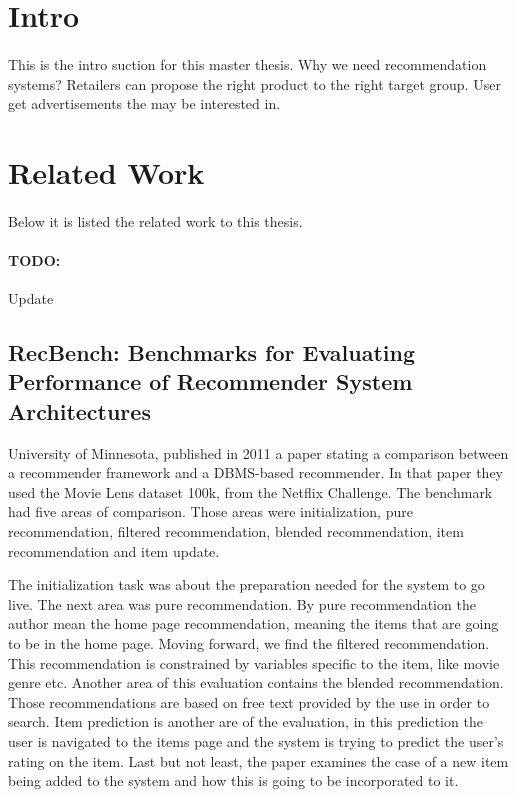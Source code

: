 \section{Intro}
\paragraph{} This is the intro suction for this master thesis.
Why we need recommendation systems? Retailers can propose the right product to the right target group.
User get advertisements the may be interested in.\cite{RecommenderSystems:2}


\section{Related Work}
\paragraph{} Below it is listed the related work to this thesis.
\paragraph{TODO:} Update
\subsection{RecBench: Benchmarks for Evaluating Performance of Recommender System Architectures \cite{levandoski2011recbench}}
University of Minnesota, published in 2011 a paper stating a comparison between a recommender framework and a DBMS-based recommender. In that paper they used the Movie Lens dataset 100k, from the Netflix Challenge. The benchmark had five areas of comparison. Those areas were initialization, pure recommendation, filtered recommendation, blended recommendation, item recommendation and item update.

The initialization task was about the preparation needed for the system to go live. The next area was pure recommendation. By pure recommendation the author mean the home page recommendation, meaning the items that are going to be in the home page. Moving forward, we find the filtered recommendation. This recommendation is constrained by variables specific to the item, like movie genre etc. Another area of this evaluation contains the blended recommendation. Those recommendations are based on free text provided by the use in order to search. Item prediction is another are of the evaluation, in this prediction the user is navigated to the items page and the system is trying to predict the user's rating on the item. Last but not least, the paper examines the case of a new item being added to the system and how this is going to be incorporated to it.

